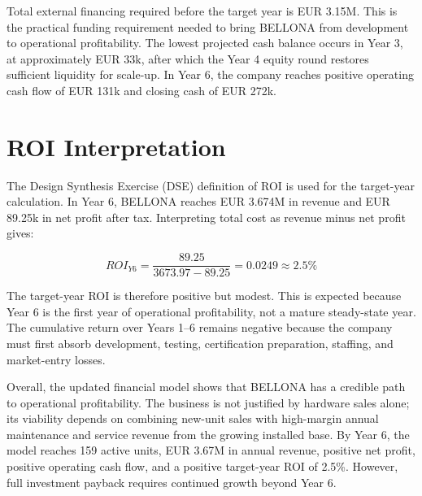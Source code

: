 Total external financing required before the target year is EUR 3.15M. This is the practical funding requirement needed to bring BELLONA from development to operational profitability. The lowest projected cash balance occurs in Year 3, at approximately EUR 33k, after which the Year 4 equity round restores sufficient liquidity for scale-up. In Year 6, the company reaches positive operating cash flow of EUR 131k and closing cash of EUR 272k.


\section{ROI Interpretation}

The Design Synthesis Exercise (DSE) definition of ROI is used for the target-year calculation. In Year 6, BELLONA reaches EUR 3.674M in revenue and EUR 89.25k in net profit after tax. Interpreting total cost as revenue minus net profit gives:

\begin{equation}
    ROI_{Y6} =
    \frac{89.25}{3673.97 - 89.25}
    = 0.0249 \approx 2.5\%
    \label{eq:roi_y6}
\end{equation}

The target-year ROI is therefore positive but modest. This is expected because Year 6 is the first year of operational profitability, not a mature steady-state year. The cumulative return over Years 1--6 remains negative because the company must first absorb development, testing, certification preparation, staffing, and market-entry losses.

Overall, the updated financial model shows that BELLONA has a credible path to operational profitability. The business is not justified by hardware sales alone; its viability depends on combining new-unit sales with high-margin annual maintenance and service revenue from the growing installed base. By Year 6, the model reaches 159 active units, EUR 3.67M in annual revenue, positive net profit, positive operating cash flow, and a positive target-year ROI of 2.5\%. However, full investment payback requires continued growth beyond Year 6.

